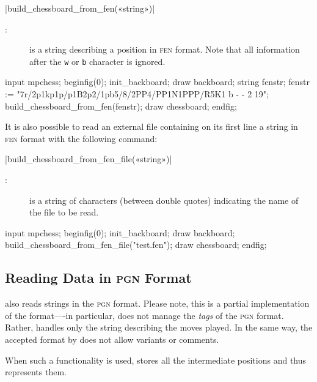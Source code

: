 \documentclass[english]{ltxdoc}
\begin{document}
\commande|build_chessboard_from_fen(«string»)|\smallskip

\begin{description}
\item[:] is a string describing a position in
\textsc{fen} format. Note that all information after the 
\texttt{w} or \texttt{b} character is ignored. 
\end{description}

\begin{ExempleMP}
input mpchess;
beginfig(0);
init_backboard;
draw backboard;
string fenstr;
fenstr := "7r/2p1kp1p/p1B2p2/1pb5/8/2PP4/PP1N1PPP/R5K1 b - - 2 19";
build_chessboard_from_fen(fenstr);
draw chessboard;
endfig;
\end{ExempleMP}


It is also possible to read an external file containing on its first line a
string in \textsc{fen} format with the following command:

\commande|build_chessboard_from_fen_file(«string»)|\smallskip

\begin{description}
  \item[:] is a string of characters (between double quotes)
  indicating the name of the file to be read.  
\end{description}


\begin{ExempleMP}
input mpchess;
beginfig(0);
init_backboard;
draw backboard;
build_chessboard_from_fen_file("test.fen");
draw chessboard;
endfig;
\end{ExempleMP}

\subsection{Reading Data in \textsc{pgn} Format}

\mpchess also reads strings in the \textsc{pgn} format.
Please note, this is a partial implementation of the format----in particular, \mpchess
does not manage the \emph{tags} of the \textsc{pgn} format. Rather, \mpchess handles only
the string describing the moves played. In the same way, the accepted format
 by \mpchess does not allow variants or comments.

When such a functionality is used, \mpchess stores all the
intermediate positions and thus represents them.
\end{document}
